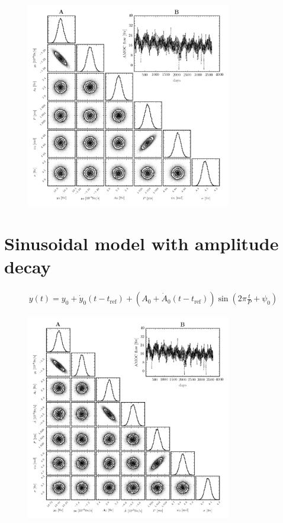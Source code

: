 \documentclass{article}
\newcommand{\tref}{t_{\textrm{ref}}}
\begin{document}
\begin{figure}[htb]
\centering
\includegraphics[width=0.8\textwidth]{img/BasicSinusoid_PosteriorWithFit}
\caption{}
\label{fig:}
\end{figure}

\section{Sinusoidal model with amplitude decay }

\begin{align}
y(t) = y_0 + \dot{y}_0(t - \tref) + (A_0 + \dot{A}_0(t-\tref)) \sin\left(2\pi \frac{t}{P} + \psi_0\right)
\end{align}

\begin{figure}[htb]
\centering
\includegraphics[width=0.8\textwidth]{img/BasicSinusoidAmplitudeDecay_PosteriorWithFit}
\caption{}
\label{fig:}
\end{figure}
\end{document}
